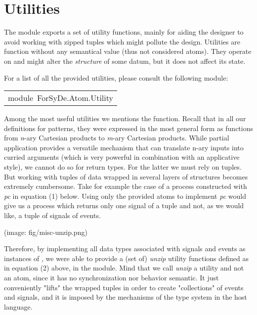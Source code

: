\section{Utilities}
The  module exports a set of utility functions,
 mainly for aiding the designer to avoid working with zipped
 tuples which might pollute the design. Utilities are function
 without any semantical value (thus not considered atoms). They
 operate on and might alter the \emph{structure} of some datum, but it
 does not affect its state.\par
For a list of all the provided utilities, please consult the
 following module:\par

\begin{haddockdesc}
\item[\begin{tabular}{@{}l}
module\ ForSyDe.Atom.Utility
\end{tabular}]
\end{haddockdesc}
Among the most useful utilities we mentions the 
 function. Recall that in all our definitions for patterns, they
 were expressed in the most general form as functions from \emph{n}-ary
 Cartesian products to \emph{m}-ary Cartesian products. While partial
 application provides a versatile mechanism that can translate
 n-ary inputs into curried arguments (which is very powerful in
 combination with an applicative style), we cannot do so for
 return types. For the latter we must rely on tuples. But working
 with tuples of data wrapped in several layers of structures
 becomes extremely cumbersome. Take for example the case of a
 process constructed with \emph{pc} in equation (1) below. Using only
 the provided atoms to implement \emph{pc} would give us a process
 which returns only one signal of a tuple and not, as we would
 like, a tuple of signals of events.\par
(image: fig/misc-unzip.png)\par
Therefore, by implementing all data types associated with signals
 and events as instances of , we were able to provide a
 (set of) \emph{unzip} utility functions defined as in equation (2)
 above, in the  module.  Mind that we call
 \emph{unzip} a utility and not an atom, since it has no
 synchronization nor behavior semantic. It just conveniently
 "lifts" the wrapped tuples in order to create "collections" of
 events and signals, and it is imposed by the mechanisms of the
 type system in the host language.\par

